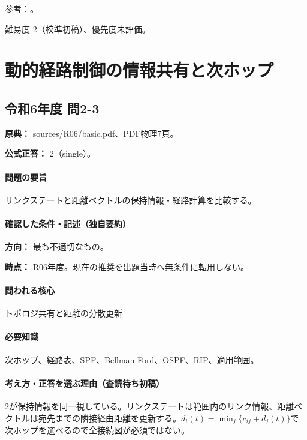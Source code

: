 \par 参考：\cite{net_dijkstra}。

\par 難易度 2（校準初稿）、優先度未評価。

\section{動的経路制御の情報共有と次ホップ}

\subsection{令和6年度 問2-3}
\label{q:r06-reg-basic-2-3}

\noindent\textbf{原典：} sources/R06/basic.pdf、PDF物理7頁。

\textbf{公式正答：} 2（single）。

\paragraph{問題の要旨} リンクステートと距離ベクトルの保持情報・経路計算を比較する。

\paragraph{確認した条件・記述（独自要約）}\mbox{}\par

\noindent\textbf{方向：} 最も不適切なもの。\par

\noindent\textbf{時点：} R06年度。現在の推奨を出題当時へ無条件に転用しない。\par

\paragraph{問われる核心} トポロジ共有と距離の分散更新

\paragraph{必要知識} 次ホップ、経路表、SPF、Bellman-Ford、OSPF、RIP、適用範囲。

\paragraph{考え方・正答を選ぶ理由（査読待ち初稿）} 2が保持情報を同一視している。リンクステートは範囲内のリンク情報、距離ベクトルは宛先までの隣接経由距離を更新する。\(d_i(t)=\min_j\{c_{ij}+d_j(t)\}\)で次ホップを選べるので全接続図が必須ではない。

